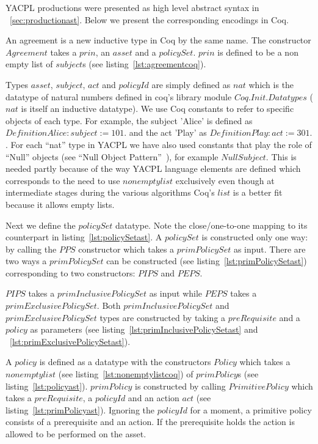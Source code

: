 YACPL productions were presented as high level abstract syntax in ~\ref{sec:productionast}. Below we present the corresponding encodings in Coq. 

An agreement is a new inductive type in Coq by the same name. The constructor $Agreement$ takes a $prin$, an $asset$ and a $policySet$. $prin$ is defined to be a non empty list of $subject$s (see listing~\ref{lst:agreementcoq}). 

Types $asset$, $subject$, $act$ and $policyId$ are simply defined as $nat$ which is the datatype of natural numbers defined in coq's library module $Coq.Init.Datatypes$ ($nat$ is itself an inductive datatype). We use Coq constants to refer to specific objects of each type. For example, the subject 'Alice' is defined as $Definition Alice:subject := 101.$ and the act 'Play' as $Definition Play : act := 301.$. For each ``nat'' type in YACPL we have also used constants that play the role of ``Null'' objects (see ``Null Object Pattern''~\cite{martin1998pattern}), for example $NullSubject$. This is needed partly because of the way YACPL language elements are defined which corresponds to the need to use $nonemptylist$ exclusively even though at intermediate stages during the various algorithms Coq's $list$ is a better fit because it allows empty lists.

Next we define the $policySet$ datatype. Note the close/one-to-one mapping to its counterpart in listing~\ref{lst:policySetast}. A $policySet$ is constructed only one way: by calling the $PPS$ constructor which takes a $primPolicySet$ as input. There are two ways a $primPolicySet$ can be constructed (see listing~\ref{lst:primPolicySetast}) corresponding to two constructors: $PIPS$ and $PEPS$. 

$PIPS$ takes a $primInclusivePolicySet$ as input while $PEPS$ takes a $primExclusivePolicySet$. Both  $primInclusivePolicySet$ and $primExclusivePolicySet$ types are constructed by taking a $preRequisite$ and a $policy$ as parameters (see listing~\ref{lst:primInclusivePolicySetast} and ~\ref{lst:primExclusivePolicySetast}). 

A $policy$ is defined as a datatype with the constructors $Policy$ which takes a $nonemptylist$ (see listing~\ref{lst:nonemptylistcoq}) of $primPolicy$s (see listing~\ref{lst:policyast}). $primPolicy$ is constructed by calling $PrimitivePolicy$ which takes a $preRequisite$, a $policyId$ and an action $act$ (see listing~\ref{lst:primPolicyast}). Ignoring the $policyId$ for a moment, a primitive policy consists of a prerequisite and an action. If the prerequisite holds the action is allowed to be performed on the asset. 

